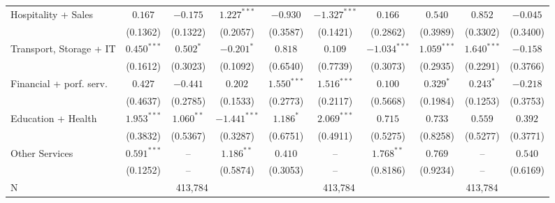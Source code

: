 \begin{tabular}{l|ccc|ccc|ccc|}
Hospitality + Sales              &         $0.167$ &       $-0.175$ &   $1.227^{***}$ &        $-0.930$ &  $-1.327^{***}$ &         $0.166$ &         $0.540$ &        $0.852$ &  $-0.045$ \\
                                 &        (0.1362) &       (0.1322) &        (0.2057) &        (0.3587) &        (0.1421) &        (0.2862) &        (0.3989) &       (0.3302) &  (0.3400) \\
Transport, Storage + IT          &   $0.450^{***}$ &      $0.502^*$ &      $-0.201^*$ &         $0.818$ &         $0.109$ &  $-1.034^{***}$ &   $1.059^{***}$ &  $1.640^{***}$ &  $-0.158$ \\
                                 &        (0.1612) &       (0.3023) &        (0.1092) &        (0.6540) &        (0.7739) &        (0.3073) &        (0.2935) &       (0.2291) &  (0.3766) \\
Financial + porf. serv.          &         $0.427$ &       $-0.441$ &         $0.202$ &   $1.550^{***}$ &   $1.516^{***}$ &         $0.100$ &       $0.329^*$ &      $0.243^*$ &  $-0.218$ \\
                                 &        (0.4637) &       (0.2785) &        (0.1533) &        (0.2773) &        (0.2117) &        (0.5668) &        (0.1984) &       (0.1253) &  (0.3753) \\
Education + Health               &   $1.953^{***}$ &   $1.060^{**}$ &  $-1.441^{***}$ &       $1.186^*$ &   $2.069^{***}$ &         $0.715$ &         $0.733$ &        $0.559$ &   $0.392$ \\
                                 &        (0.3832) &       (0.5367) &        (0.3287) &        (0.6751) &        (0.4911) &        (0.5275) &        (0.8258) &       (0.5277) &  (0.3771) \\
Other Services                   &   $0.591^{***}$ &             -- &    $1.186^{**}$ &         $0.410$ &              -- &    $1.768^{**}$ &         $0.769$ &             -- &   $0.540$ \\
                                 &        (0.1252) &             -- &        (0.5874) &        (0.3053) &              -- &        (0.8186) &        (0.9234) &             -- &  (0.6169) \\
\midrule
N                        & \multicolumn{3}{c}{413,784} & \multicolumn{3}{c}{413,784} &   \multicolumn{3}{c}{413,784} \\
\bottomrule
\end{tabular}
